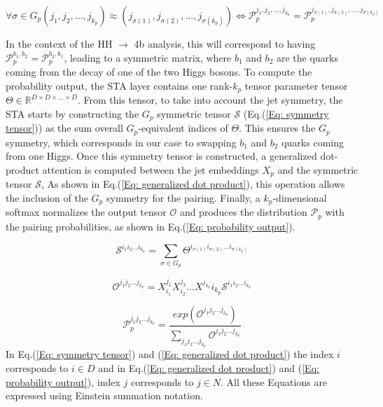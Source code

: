  \begin{equation}
     \forall \sigma \in G_p (j_1,j_2,...,j_{k_p}) \approx (j_{\sigma(1)},j_{\sigma(2)},...,j_{\sigma(k_p)}) \Leftrightarrow \mathcal{P}_p^{j_1,j_2,...,j_{k_p}} = \mathcal{P}_p^{j_{\sigma(1)},j_{\sigma(2)},...,j_{\sigma(k_p)}}
 \end{equation}

 
 In the context of the HH $\to$ 4b analysis, this will correspond to having $\mathcal{P}_p^{b_1,b_2}=\mathcal{P}_p^{b_2,b_1}$, leading to a symmetric matrix, where $b_1$ and $b_2$ are the quarks coming from the decay of one of the two Higgs bosons. To compute the probability output, the STA layer contains one rank-$k_p$ tensor parameter tensor $\Theta \in \mathbb{R}^{D\times D \times ... \times D}$. From this tensor, to take into account the jet symmetry, the STA starts by constructing the $G_p$ symmetric tensor $\mathcal{S}$ (Eq.(\ref{Eq: symmetry tensor})) as the sum overall $G_p$-equivalent indices of $\Theta$. This ensures the $G_p$ symmetry, which corresponds in our case to swapping $b_1$ and $b_2$ quarks coming from one Higgs. Once this symmetry tensor is constructed, a generalized dot-product attention \cite{SPANet} is computed between the jet embeddings $X_p$ and the symmetric tensor $\mathcal{S}$, As shown in Eq.(\ref{Eq: generalized dot product}), this operation allows the inclusion of the $G_p$ symmetry for the pairing.  Finally, a $k_p$-dimensional softmax normalizes the output tensor $\mathcal{O}$ and produces the distribution $\mathcal{P}_p$ with the pairing probabilities, as shown in Eq.(\ref{Eq: probability output}). 

 \begin{equation}
     \mathcal{S}^{i_1i_2...i_{k_p}}=\sum_{\sigma \in G_p} \Theta^{i_{\sigma(1)}i_{\sigma(2)}...i_{\sigma(k_p)}}
     \label{Eq: symmetry tensor}
 \end{equation}

 \begin{equation}
    \mathcal{O}^{j_1j_2...j_{k_p}}=X^{j_1}_{i_1}X^{j_2}_{i_2}...X^{j_{k_p}}{i_{k_p}}\mathcal{S}^{i_1i_2...i_{k_p}}
    \label{Eq: generalized dot product}
 \end{equation}

 \begin{equation}
     \mathcal{P}_p^{j_1j_2...j_{k_p}}=\frac{exp(\mathcal{O}^{j_1j_2...j_{k_p}})}{\sum_{j_1j_2...j_{k_p}}\mathcal{O}^{j_1j_2...j_{k_p}}}
     \label{Eq: probability output}
 \end{equation}
 \noindent In  Eq.(\ref{Eq: symmetry tensor}) and (\ref{Eq: generalized dot product}) the index $i$ corresponds to $i \in D$ and in Eq.(\ref{Eq: generalized dot product}) and (\ref{Eq: probability output}), index $j$ corresponds to $j \in N$. All these Equations \cite{SPANet} are expressed using Einstein summation notation.

